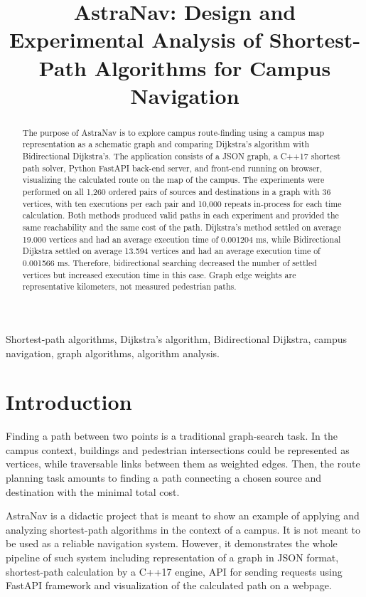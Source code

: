 \documentclass[conference]{IEEEtran}
\title{AstraNav: Design and Experimental Analysis of Shortest-Path Algorithms for Campus Navigation}
\author{
    \IEEEauthorblockN{
        Swagatam Behera (AP25110070661) , \
        Katragadda Nehasri (AP25110070846)
    }
    \IEEEauthorblockA{
        \textit{Dept.\ of Computer Science \& Engineering}, \\
        \textit{SRM University--AP, Andhra Pradesh, India} \\
        \textit{Guide:} Prof.\ Srinivas Arukonda, Assistant Professor, Dept.\ of CSE
    }
}
\begin{document}
\maketitle

\begin{abstract}
The purpose of AstraNav is to explore campus route-finding using a campus map representation as a schematic graph and comparing Dijkstra's algorithm with Bidirectional Dijkstra's. The application consists of a JSON graph, a C++17 shortest path solver, Python FastAPI back-end server, and front-end running on browser, visualizing the calculated route on the map of the campus. The experiments were performed on all 1,260 ordered pairs of sources and destinations in a graph with 36 vertices, with ten executions per each pair and 10,000 repeats in-process for each time calculation. Both methods produced valid paths in each experiment and provided the same reachability and the same cost of the path. Dijkstra's method settled on average 19.000 vertices and had an average execution time of 0.001204 ms, while Bidirectional Dijkstra settled on average 13.594 vertices and had an average execution time of 0.001566 ms. Therefore, bidirectional searching decreased the number of settled vertices but increased execution time in this case. Graph edge weights are representative kilometers, not measured pedestrian paths.
\end{abstract}

\begin{IEEEkeywords}
Shortest-path algorithms, Dijkstra's algorithm, Bidirectional Dijkstra, campus navigation, graph algorithms, algorithm analysis.
\end{IEEEkeywords}

\section{Introduction}
Finding a path between two points is a traditional graph-search task. In the campus context, buildings and pedestrian intersections could be represented as vertices, while traversable links between them as weighted edges. Then, the route planning task amounts to finding a path connecting a chosen source and destination with the minimal total cost.

AstraNav is a didactic project that is meant to show an example of applying and analyzing shortest-path algorithms in the context of a campus. It is not meant to be used as a reliable navigation system. However, it demonstrates the whole pipeline of such system including representation of a graph in JSON format, shortest-path calculation by a C++17 engine, API for sending requests using FastAPI framework and visualization of the calculated path on a webpage.
\end{document}
